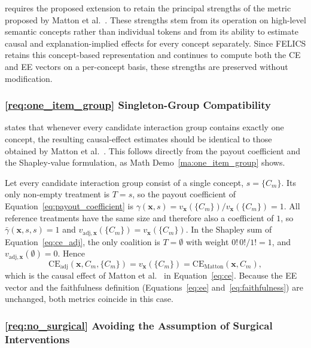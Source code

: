 requires the proposed extension to retain the principal strengths of the metric proposed by Matton et al.~\cite{mattonWalkTalkMeasuring2024}. These strengths stem from its operation on high-level semantic concepts rather than individual tokens and from its ability to estimate causal and explanation-implied effects for every concept separately. Since FELICS retains this concept-based representation and continues to compute both the CE and EE vectors on a per-concept basis, these strengths are preserved without modification.

\subsubsection{\ref{req:one_item_group} Singleton-Group Compatibility}

 states that whenever every candidate interaction group contains exactly one concept, the resulting causal-effect estimates should be identical to those obtained by Matton et al.~\cite{mattonWalkTalkMeasuring2024}. This follows directly from the payout coefficient and the Shapley-value formulation, as Math Demo~\ref{ma:one_item_group} shows.

\begin{math_box}[label=ma:one_item_group]
	Let every candidate interaction group consist of a single concept, $s=\{C_m\}$. Its only non-empty treatment is $T=s$, so the payout coefficient of Equation~\ref{eq:payout_coefficient} is $\gamma(\mathbf{x},s)=v_{\mathbf{x}}(\{C_m\})/v_{\mathbf{x}}(\{C_m\})=1$. All reference treatments have the same size and therefore also a coefficient of $1$, so $\bar\gamma(\mathbf{x},s,s)=1$ and $v_{\mathrm{adj},\mathbf{x}}(\{C_m\})=v_{\mathbf{x}}(\{C_m\})$. In the Shapley sum of Equation~\ref{eq:ce_adj}, the only coalition is $T=\emptyset$ with weight $0!\,0!/1!=1$, and $v_{\mathrm{adj},\mathbf{x}}(\emptyset)=0$. Hence
	\begin{equation}
		\mathrm{CE}_{\mathrm{adj}}(\mathbf{x},C_m,\{C_m\})
		=
		v_{\mathbf{x}}(\{C_m\})
		=
		\mathrm{CE}_{\mathrm{Matton}}(\mathbf{x},C_m),
	\end{equation}
	which is the causal effect of Matton et al.~\cite{mattonWalkTalkMeasuring2024} in Equation~\ref{eq:ce}. Because the EE vector and the faithfulness definition (Equations~\ref{eq:ee} and~\ref{eq:faithfulness}) are unchanged, both metrics coincide in this case.
\end{math_box}

\subsubsection{\ref{req:no_surgical} Avoiding the Assumption of Surgical Interventions}

